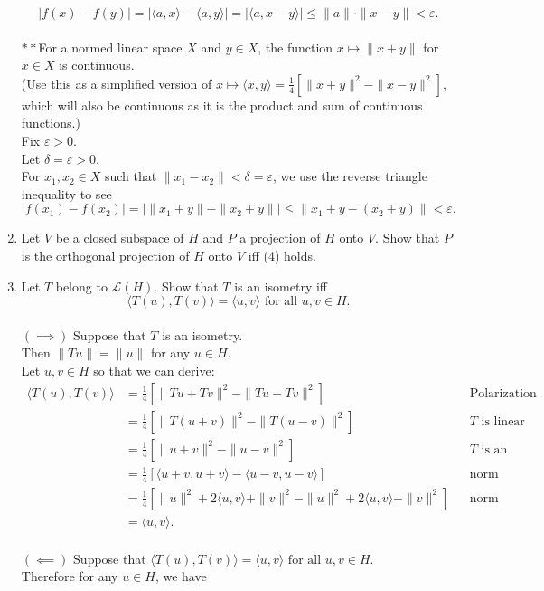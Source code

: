 \begin{enumerate}
    \[
        |f(x)-f(y)|=|\langle a,x\rangle-\langle a,y\rangle|=|\langle a,x-y\rangle|\le\|a\|\cdot\|x-y\|<\varepsilon.
    \]
    \\$\ast\ast$For a normed linear space $X$ and $y\in X$, the function $x\mapsto\|x+y\|$ for $x\in X$ is continuous.
    \\(Use this as a simplified version of $x\mapsto\langle x,y\rangle=\frac{1}{4}[\|x+y\|^2-\|x-y\|^2]$, which will also be continuous as it is the product and sum of continuous functions.)
    \\Fix $\varepsilon>0$.
    \\Let $\delta=\varepsilon>0$.
    \\For $x_1,x_2\in X$ such that $\|x_1-x_2\|<\delta=\varepsilon$, we use the reverse triangle inequality to see
    \[
        |f(x_1)-f(x_2)|=|\|x_1+y\|-\|x_2+y\||\le\|x_1+y-(x_2+y)\|<\varepsilon.
    \]
    \item Let $V$ be a closed subspace of $H$ and $P$ a projection of $H$ onto $V$. Show that $P$ is the orthogonal projection of $H$ onto $V$ iff (4) holds.
    \item Let $T$ belong to $\mathcal{L}(H)$. Show that $T$ is an isometry iff
    \[
        \langle T(u),T(v)\rangle=\langle u,v\rangle\text{ for all }u,v\in H.
    \]
    \\$(\implies)$ Suppose that $T$ is an isometry.
    \\Then $\|Tu\|=\|u\|$ for any $u\in H$.
    \\Let $u,v\in H$ so that we can derive:
    \begin{align*}
        \langle T(u),T(v)\rangle&=\frac{1}{4}[\|Tu+Tv\|^2-\|Tu-Tv\|^2]&&\text{Polarization identity}\\
        &=\frac{1}{4}[\|T(u+v)\|^2-\|T(u-v)\|^2]&&T\text{ is linear}\\
        &=\frac{1}{4}[\|u+v\|^2-\|u-v\|^2]&&T\text{ is an isometry}\\
        &=\frac{1}{4}[\langle u+v,u+v\rangle-\langle u-v,u-v\rangle]&&\text{norm induced by inner product}\\
        &=\frac{1}{4}[\|u\|^2+2\langle u,v\rangle+\|v\|^2-\|u\|^2+2\langle u,v\rangle-\|v\|^2]&&\text{norm induced by inner product}\\
        &=\langle u,v\rangle.
    \end{align*}
    \\$(\impliedby)$ Suppose that $\langle T(u),T(v)\rangle=\langle u,v\rangle\text{ for all }u,v\in H$.
    \\Therefore for any $u\in H$, we have 

\end{enumerate}
